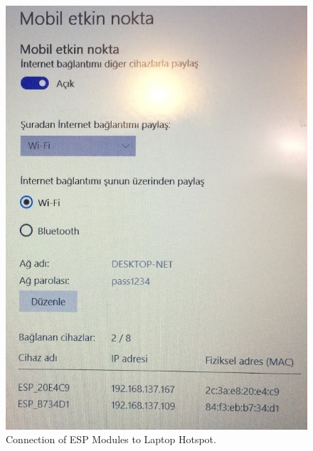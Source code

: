 \documentclass[a4paper,12pt]{article}
\begin{document}
\begin{figure}[t]
	\center
	\setlength{\unitlength}{\textwidth} 
	\includegraphics[width=0.4\unitlength]{images/laptop-esp-wifi}
	\caption{\label{fig:laptop-esp-wifi}Connection of ESP Modules to Laptop Hotspot.}
\end{figure}
\end{document}
